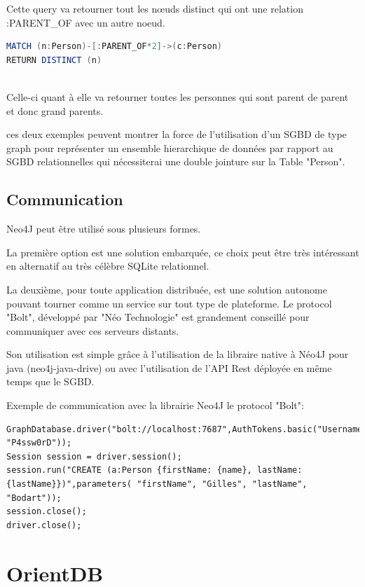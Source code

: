 \documentclass[a4paper,fleqn,12pt]{report}
\begin{document}
Cette query va retourner tout les nœuds distinct qui ont une relation :PARENT\_OF avec un autre noeud.

\begin{lstlisting}[language=java, frame=single]
MATCH (n:Person)-[:PARENT_OF*2]->(c:Person) 
RETURN DISTINCT (n)
	
\end{lstlisting}

Celle-ci quant à elle va retourner toutes les personnes qui sont parent de parent et donc grand parents. 

ces deux exemples peuvent montrer la force de l'utilisation d'un SGBD de type graph pour représenter un ensemble hierarchique de données par rapport au SGBD relationnelles qui nécessiterai une double jointure sur la Table "Person".

\section{Communication}

Neo4J peut être utilisé sous plusieurs formes. 

La première option est une solution embarquée, ce choix peut être très intéressant en alternatif au très célèbre SQLite relationnel.

La deuxième, pour toute application distribuée, est une solution autonome pouvant tourner comme un service sur tout type de plateforme. Le protocol "Bolt", développé par "Néo Technologie" est grandement conseillé pour communiquer avec ces serveurs distants. 

Son utilisation est simple grâce à l'utilisation de la libraire native à Néo4J pour java (neo4j-java-drive) ou avec l'utilisation de l'API Rest déployée en même temps que le SGBD.

Exemple de communication avec la librairie Neo4J le protocol "Bolt":

\begin{lstlisting}
GraphDatabase.driver("bolt://localhost:7687",AuthTokens.basic("Username", "P4ssw0rD"));
Session session = driver.session();
session.run("CREATE (a:Person {firstName: {name}, lastName: {lastName}})",parameters( "firstName", "Gilles", "lastName", "Bodart"));
session.close();
driver.close();

\end{lstlisting}

\chapter{OrientDB}
\end{document}
